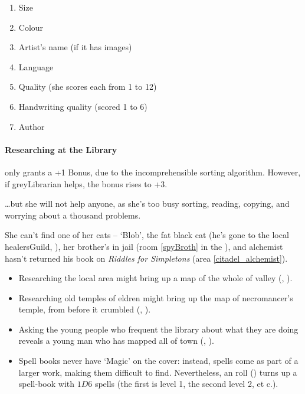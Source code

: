 \begin{multicols}{2}
\begin{multicols}{2}
\begin{enumerate}
  \item
  Size
  \item
  Colour
  \item
  Artist's name (if it has images)
  \item
  Language
  \item
  Quality (she scores each from 1 to 12)
  \item
  Handwriting quality (scored 1 to 6)
  \item
  Author
\end{enumerate}
\end{multicols}

\paragraph{Researching at the Library}
only grants a +1 Bonus, due to the incomprehensible sorting algorithm.
However, if \gls{greyLibrarian} helps, the bonus rises to +3.

\ldots but she will not help anyone, as she's too busy sorting, reading, copying, and worrying about a thousand problems.

She can't find one of her cats -- `Blob', the fat black cat (he's gone to the local \gls{healersGuild}, ),
her brother's in jail (room  \vref{spyBroth} in the ), and \gls{alchemist} hasn't returned his book on \textit{Riddles for Simpletons} (area \vref{citadel_alchemist}).
\label{paperCat}


\begin{itemize}
  \item
  Researching the local area might bring up a map of the whole of \gls{valley} (, \tn[14]).
  \item
  Researching old temples of \gls{eldren} might bring up the map of \gls{necromancer}'s temple, from before it crumbled (, \tn[10]).
  \item
  Asking the young people who frequent the library about what they are doing reveals a young man who has mapped all of \gls{town} (, \tn[10]).
  \item
  Spell books never have `Magic' on the cover: instead, spells come as part of a larger work, making them difficult to find.
  Nevertheless, an  roll (\tn[9]) turns up a spell-book with $1D6$ spells (the first is level 1, the second level 2, et c.).


\end{itemize}
\end{multicols}
